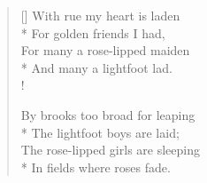 \documentclass[MAIN]{subfiles}
\begin{document}
\settowidth{\versewidth}{With rue my heart is laden}
\begin{verse}[\versewidth]
With rue my heart is laden\\*
\vin For golden friends I had,\\
For many a rose-lipped maiden\\*
\vin And many a lightfoot lad.\\!

By brooks too broad for leaping\\*
\vin The lightfoot boys are laid;\\
The rose-lipped girls are sleeping\\*
\vin In fields where roses fade.
\end{verse}
\end{document}
